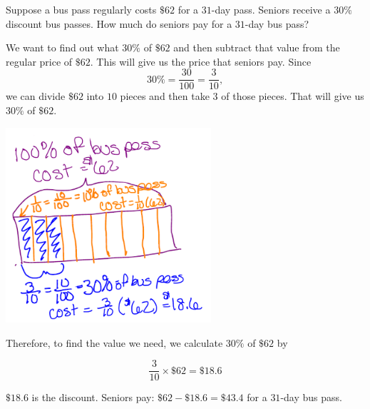 \documentclass{ximera}
\begin{document}
\begin{example}
Suppose a bus pass regularly costs $\$62$ for a $31$-day pass. Seniors receive a $30\%$ discount bus passes. How much do seniors pay for a $31$-day bus pass?

\begin{explanation}
We want to find out what $30\%$ of $\$62$ and then subtract that value from the regular price of $\$62$.  This will give us the price that seniors pay.  Since $$30\%=\frac{30}{100}=\frac{3}{10},$$ we can divide $\$62$ into $10$ pieces and then take $3$ of those pieces.  That will give us $30\%$ of $\$62$.

\begin{image}
    \includegraphics[width=3in]{percentpic.png}
\end{image}

%
%
%


Therefore, to find the value we need, we calculate $30\%$ of $\$62$ by

$$ \frac{3}{10} \times \$62 = \$18.6$$ 

$\$18.6$ is the discount.  Seniors pay: $\$62 - \$18.6 = \$43.4$ for a $31$-day bus pass.
\end{explanation}
\end{example}
\end{document}
